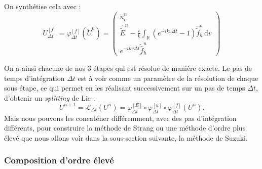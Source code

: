 On synthétise cela avec :
$$
  U^{[f]}_{\Delta t} = \varphi^{[f]}_{\Delta t}(\tilde{U}^n)
  = \begin{pmatrix}
          \tilde{u}_c^n \\
\hat{\tilde{E}}^n - \frac{i}{k}\int_\mathbb{R} \left(e^{-ikv\Delta t}-1\right)\hat{\tilde{f}}_h^n\,\mathrm{d}v\\ 
          e^{-ikv\Delta t}\tilde{\hat{f}}_h^n
        \end{pmatrix}
$$

On a ainsi chacune de nos 3 étapes qui est résolue de manière exacte. Le pas de temps d'intégration $\Delta t$ est à voir comme un paramètre de la résolution de chaque sous étape, ce qui permet en les réalisant successivement sur un pas de temps $\Delta t$, d'obtenir un \emph{splitting} de Lie :
\begin{equation}
  U^{n+1} = \mathcal{L}_{\Delta t}(U^n) = \varphi^{[E]}_{\Delta t} \circ \varphi^{[u]}_{\Delta t} \circ \varphi^{[f]}_{\Delta t}(U^n).
  \label{eq:lie}
\end{equation}
Mais nous pouvons les concaténer différemment, avec des pas d'intégration différents, pour construire la méthode de Strang ou une méthode d'ordre plus élevé que nous allons voir dans la sous-section suivante, la méthode de Suzuki.

\subsubsection{Composition d'ordre élevé}

